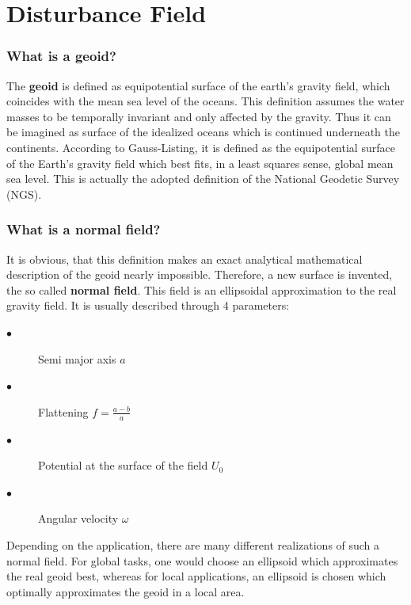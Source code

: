 \documentclass[a4paper,12pt]{report}
\begin{document}
\newpage
\chapter{Disturbance Field}
\subsection{What is a  geoid?}
The \textbf{geoid} is defined as equipotential surface of the earth’s gravity field, which coincides with the mean sea level of the oceans. This definition assumes the water masses to be temporally invariant and only affected by the gravity. Thus it can be imagined as surface of the idealized oceans which is continued underneath the continents. According to Gauss-Listing, it is defined as the equipotential surface of the Earth’s gravity field which best fits, in a least squares sense, global mean sea level. This is actually the adopted definition of the National Geodetic Survey (NGS).\\

\subsection{What is a normal field?}
It is obvious, that this definition makes an exact analytical mathematical description of the geoid nearly impossible. Therefore, a new surface is invented, the so called \textbf{normal field}. This field is an ellipsoidal approximation to the real gravity field. It is usually described through 4 parameters:
\begin{description}
\item[$\bullet$]Semi major axis $a$
\item[$\bullet$]Flattening $f=\frac{a-b}{a}$
\item[$\bullet$]Potential at the surface of the field $U_0$
\item[$\bullet$]Angular velocity $\omega$
\end{description}
Depending on the application, there are many different realizations of such a normal field. For global tasks, one would choose an ellipsoid which approximates the real geoid
best, whereas for local applications, an ellipsoid is chosen which optimally approximates the geoid in a local area.\\
\end{document}
